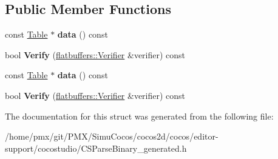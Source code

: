 \subsection*{Public Member Functions}
\begin{DoxyCompactItemize}
\item 
\mbox{\label{structflatbuffers_1_1Options_a162093f804b9226803635de4994a2352}} 
const \hyperlink{classflatbuffers_1_1Table}{Table} $\ast$ {\bfseries data} () const
\item 
\mbox{\label{structflatbuffers_1_1Options_affbd90f11a3907c05fc3041ae7494a1a}} 
bool {\bfseries Verify} (\hyperlink{classflatbuffers_1_1Verifier}{flatbuffers\+::\+Verifier} \&verifier) const
\item 
\mbox{\label{structflatbuffers_1_1Options_a162093f804b9226803635de4994a2352}} 
const \hyperlink{classflatbuffers_1_1Table}{Table} $\ast$ {\bfseries data} () const
\item 
\mbox{\label{structflatbuffers_1_1Options_affbd90f11a3907c05fc3041ae7494a1a}} 
bool {\bfseries Verify} (\hyperlink{classflatbuffers_1_1Verifier}{flatbuffers\+::\+Verifier} \&verifier) const
\end{DoxyCompactItemize}


The documentation for this struct was generated from the following file\+:\begin{DoxyCompactItemize}
\item 
/home/pmx/git/\+P\+M\+X/\+Simu\+Cocos/cocos2d/cocos/editor-\/support/cocostudio/C\+S\+Parse\+Binary\+\_\+generated.\+h\end{DoxyCompactItemize}
